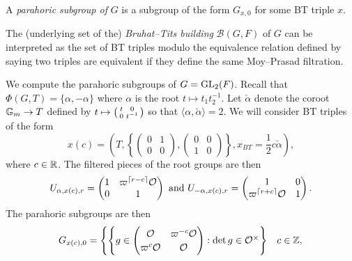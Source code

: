 \begin{defn}
    A \textit{parahoric subgroup of} $G$ is a subgroup of the form $G_{x,0}$ for some BT triple $x$.
\end{defn}

\begin{rem}
    The (underlying set of the) \textit{Bruhat--Tits building} $\mathcal B(G,F)$ of $G$ can be interpreted as the set of BT triples modulo the equivalence relation defined by saying two triples are equivalent if they define the same Moy--Prasad filtration.
\end{rem}

\begin{example}\label{ex:parahoric}
    We compute the parahoric subgroups of $G=\GL_2(F)$. Recall that $\Phi(G,T)=\{\alpha,-\alpha\}$ where $\alpha$ is the root $t \mapsto t_1t_2^{-1}$. Let $\check\alpha$ denote the coroot $\GG_m \to T$ defined by $t \mapsto \begin{psmallmatrix}
        t&0\\0&t^{-1}
    \end{psmallmatrix}$ so that $\langle \alpha,\check \alpha\rangle=2$. We will consider BT triples of the form 
    $$x(c) = \left(T, \left\{\begin{pmatrix}
        0&1\\0&0
    \end{pmatrix}, \begin{pmatrix}
        0&0\\1&0
    \end{pmatrix}\right\}, x_{BT} = \frac{1}{2}c\check\alpha\right),$$ where $c \in \RR$. The filtered pieces of the root groups are then 
    $$U_{\alpha,x(c),r} = \begin{pmatrix}
        1& \varpi^{\lceil r-c\rceil}\cO \\ 0 & 1
    \end{pmatrix} \text{ and } U_{-\alpha,x(c),r} = \begin{pmatrix}
        1& 0 \\ \varpi^{\lceil r+c\rceil}\cO & 1
    \end{pmatrix}.$$
    The parahoric subgroups are then 
    $$
    G_{x(c),0} = 
    \begin{cases}
        \left\{
        g \in    
        \begin{pmatrix}
            \cO & \varpi^{-c}\cO \\ \varpi^{c} \cO & \cO
        \end{pmatrix} : \det g \in \cO^\times
        \right\} & c \in \ZZ, \\

\end{cases}$$
\end{example}
